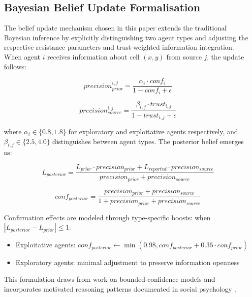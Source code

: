 \documentclass[pdflatex,sn-apa]{sn-jnl}%
\begin{document}
\begin{appendices}
\section{Bayesian Belief Update Formalisation}

The belief update mechanism chosen in this paper extends the traditional Bayesian inference \citep{schneider2025emergency} by explicitly distinguishing two agent types and adjusting the respective resistance parameters and trust-weighted information integration. When agent $i$ receives information about cell $(x,y)$ from source $j$, the update follows:

\begin{equation}
precision_{prior}^{i,j} = \frac{\alpha_i \cdot conf_i}{ 1 - conf_i + \epsilon}
\end{equation}

\begin{equation}
precision_{source}^{i,j} = \frac{\beta_{i,j} \cdot trust_{i,j}}{1 - trust_{i,j} + \epsilon}
\end{equation}

where $\alpha_i \in \{0.8, 1.8\}$ for exploratory and exploitative agents respectively, and $\beta_{i,j} \in \{2.5, 4.0\}$ distinguishes between agent types. The posterior belief emerges as:

\begin{equation}
L_{posterior} = \frac{L_{prior} \cdot precision_{prior} + L_{reported} \cdot precision_{source}}{precision_{prior} + precision_{source}}
\end{equation}

\begin{equation}
conf_{posterior} = \frac{precision_{prior} + precision_{source}}{1 + precision_{prior} + precision_{source}}
\end{equation}

Confirmation effects are modeled through type-specific boosts: when $|L_{posterior} - L_{prior}| \leq 1$:
\begin{itemize}
   \item Exploitative agents: $conf_{posterior} \leftarrow \min(0.98, conf_{posterior} + 0.35 \cdot conf_{prior})$
   \item Exploratory agents: minimal adjustment to preserve information openness
\end{itemize}

This formulation draws from work on bounded-confidence models \citep{deffuant2000mixing} and incorporates motivated reasoning patterns documented in social psychology \citep{kunda1990case}.


\end{appendices}
\end{document}
